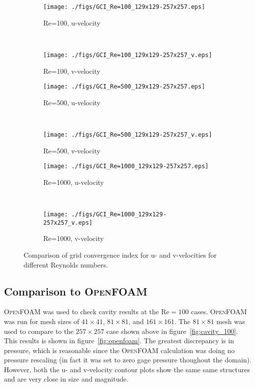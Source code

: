 \documentclass[10pt, letterpaper]{article}
\newcommand{\fig}[1]{figure~\ref{#1}}
\newcommand{\mesh}[1]{${#1} \times {#1}$}
\begin{document}
\begin{figure}[p]
	\centering
	\begin{subfigure}[b]{0.475\textwidth}
		\centering
		\texttt{[image: ./figs/GCI\_Re=100\_129x129-257x257.eps]}
		\caption{Re=100, u-velocity}
	\end{subfigure}
	~
	\begin{subfigure}[b]{0.475\textwidth}
		\centering
		\texttt{[image: ./figs/GCI\_Re=100\_129x129-257x257\_v.eps]}
		\caption{Re=100, v-velocity}
	\end{subfigure}
	
	\begin{subfigure}[b]{0.475\textwidth}
		\centering
		\texttt{[image: ./figs/GCI\_Re=500\_129x129-257x257.eps]}
		\caption{Re=500, u-velocity}
	\end{subfigure}
	~
	\begin{subfigure}[b]{0.475\textwidth}
		\centering
		\texttt{[image: ./figs/GCI\_Re=500\_129x129-257x257\_v.eps]}
		\caption{Re=500, v-velocity}
	\end{subfigure}
	
	\begin{subfigure}[b]{0.475\textwidth}
		\centering
		\texttt{[image: ./figs/GCI\_Re=1000\_129x129-257x257.eps]}
		\caption{Re=1000, u-velocity}
	\end{subfigure}
	~
	\begin{subfigure}[b]{0.475\textwidth}
		\centering
		\texttt{[image: ./figs/GCI\_Re=1000\_129x129-257x257\_v.eps]}
		\caption{Re=1000, v-velocity}
	\end{subfigure}
	\caption{Comparison of grid convergence index for u- and v-velocities for
		different Reynolds numbers.}
	\label{fig:gci_re}
\end{figure}


\subsection{Comparison to \textsc{OpenFOAM}}

\textsc{OpenFOAM} was used to check cavity results at the $\mathrm{Re}=100$
cases.  \textsc{OpenFOAM} was run for mesh sizes of \mesh{41}, \mesh{81}, and
\mesh{161}.
The \mesh{81} mesh was used to compare to the \mesh{257} case shown above in
figure~\ref{fig:cavity_100}.  This results is shown in \fig{fig:openfoam}.
The greatest discrepancy is in pressure, which is reasonable since the
\textsc{OpenFOAM} calculation was doing no pressure rescaling (in
fact it was set to zero gage pressure thoughout the domain).  However, both the
u- and v-velocity contour plots show the same same structures and are very
close in size and magnitude.
\end{document}
